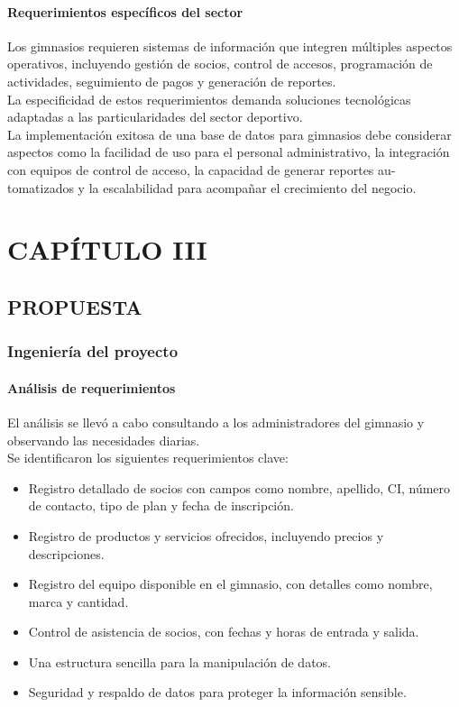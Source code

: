\documentclass[12pt, letterpaper]{article}
\begin{document}
\paragraph{\textbf{Requerimientos específicos del sector}}
Los gimnasios requieren sistemas de información que integren múltiples aspectos operativos, incluyendo gestión de socios, control de accesos, programación de actividades, seguimiento de pagos y generación de reportes.\\
La especificidad de estos requerimientos demanda soluciones tecnológicas adaptadas a las particularidades del sector deportivo.\\
La implementación exitosa de una base de datos para gimnasios debe considerar aspectos como la facilidad de uso para el personal administrativo, la integración con equipos de control de acceso, la capacidad de generar reportes au-tomatizados y la escalabilidad para acompañar el crecimiento del negocio.
\newpage

\section*{CAPÍTULO III}
\setcounter{section}{3}
\subsection{PROPUESTA}
\subsubsection{Ingeniería del proyecto}
\paragraph{Análisis de requerimientos}
El análisis se llevó a cabo consultando a los administradores del gimnasio y observando las necesidades diarias.\\
Se identificaron los siguientes requerimientos clave:\\
\begin{itemize}
    \item Registro detallado de socios con campos como nombre, apellido, CI, número de contacto, tipo de plan y fecha de inscripción.
    \item Registro de productos y servicios ofrecidos, incluyendo precios y descripciones.
    \item Registro del equipo disponible en el gimnasio, con detalles como nombre, marca y cantidad.
    \item Control de asistencia de socios, con fechas y horas de entrada y salida.
    \item Una estructura sencilla para la manipulación de datos.
    \item Seguridad y respaldo de datos para proteger la información sensible.
\end{itemize}
\newpage
\end{document}
